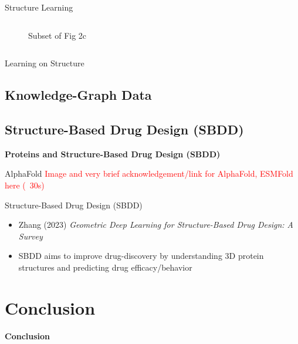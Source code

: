 \documentclass{beamer}
\begin{document}
\begin{frame}{Structure Learning}
\begin{columns}[T]
\begin{column}{0.5\textwidth}
\begin{figure}
            \caption{Subset of Fig 2c \cite{ektefaie_multimodal_2023}}
        \end{figure}    
    \end{column}
\end{columns}
\end{frame}

\begin{frame}{Learning on Structure}
    
\end{frame}


\subsection{Knowledge-Graph Data}


\subsection{Structure-Based Drug Design (SBDD)}

\begin{frame}{}
    \bf{\Large Proteins and Structure-Based Drug Design (SBDD)}    
\end{frame}

\begin{frame}{AlphaFold}
    \textcolor{red}{Image and very brief acknowledgement/link for AlphaFold, ESMFold here (~30s)}
\end{frame}


\begin{frame}{Structure-Based Drug Design (SBDD)}
    \begin{itemize}
        \item Zhang (2023) {\it Geometric Deep Learning for Structure-Based Drug Design: A Survey} \cite{zhang_systematic_2023}
        \item SBDD aims to improve drug-discovery by understanding 3D protein structures and predicting drug efficacy/behavior %
    \end{itemize}
\end{frame}


\section*{Conclusion}

\begin{frame}{}
    \bf{\LARGE Conclusion}    
\end{frame}
\end{document}
